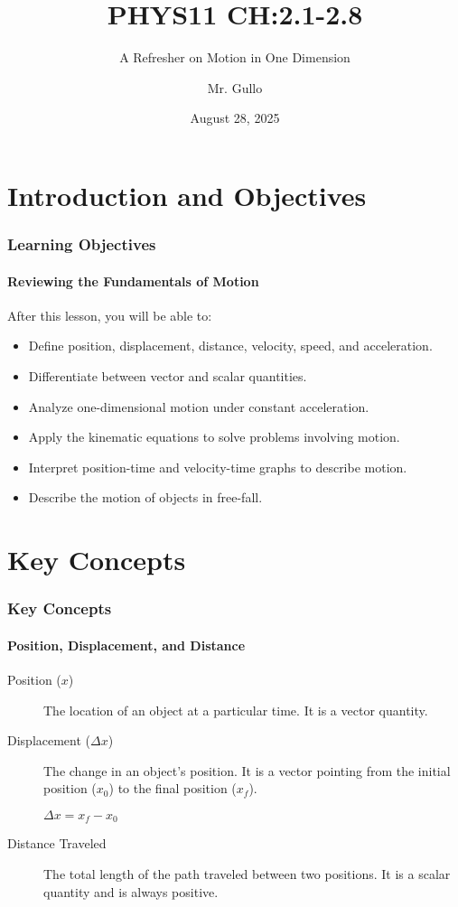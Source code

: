 \documentclass{beamer}
\title[1D Kinematics Review]{PHYS11 CH:2.1-2.8}
\subtitle{A Refresher on Motion in One Dimension}
\author[Mr. Gullo]{Mr. Gullo}
\date[Aug 28, 2025]{August 28, 2025}
\begin{document}
\frame{\titlepage}

\section{Introduction and Objectives}

\begin{frame}
\frametitle{Learning Objectives}
\framesubtitle{Reviewing the Fundamentals of Motion}
After this lesson, you will be able to:
\begin{itemize}
    \item Define position, displacement, distance, velocity, speed, and acceleration.
    \item Differentiate between vector and scalar quantities.
    \item Analyze one-dimensional motion under constant acceleration.
    \item Apply the kinematic equations to solve problems involving motion.
    \item Interpret position-time and velocity-time graphs to describe motion.
    \item Describe the motion of objects in free-fall.
\end{itemize}
\end{frame}

\section{Key Concepts}

\begin{frame}
\frametitle{Key Concepts}
\framesubtitle{Position, Displacement, and Distance}
\begin{description}
    \item[Position ($x$)] The location of an object at a particular time. It is a vector quantity.
    \pause
    \item[Displacement ($\Delta x$)] The change in an object's position. It is a vector pointing from the initial position ($x_0$) to the final position ($x_f$).
    \begin{center}
        $\Delta x = x_f - x_0$
    \end{center}
    \pause
    \item[Distance Traveled] The total length of the path traveled between two positions. It is a scalar quantity and is always positive.
\end{description}
\end{frame}
\end{document}
